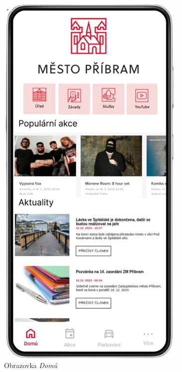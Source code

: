 \begin{minipage}[t]{0.45\textwidth}
  \begin{figure}[H]
    \centering
    \includegraphics[width=.6\textwidth]{screen1.png}
    \caption{Obrazovka \textit{Domů}}
    \label{fig:mockup1}
  \end{figure}
  \begin{figure}[H]
    \centering

\end{figure}
\end{minipage}
